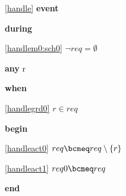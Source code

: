 \noindent \ref{handle}  \textbf{event}
\begin{block}
  \item   \textbf{during}
  \begin{block}
  \item[ \eqref{handlem0:sch0} ]{$\neg req = \emptyset$} %
  \end{block}
  \item   \textbf{any} r
  \item   \textbf{when}
  \begin{block}
  \item[ \eqref{handlegrd0} ]{$r \in req$} %
  \end{block}
  \item   \textbf{begin}
  \begin{block}
  \item[ \eqref{handleact0} ]{$req \bcmeq req \setminus \{ r \}$} %
  \item[ \eqref{handleact1} ]{$req0 \bcmeq req$} %
  \end{block}
  \item   \textbf{end} \\
\end{block}
